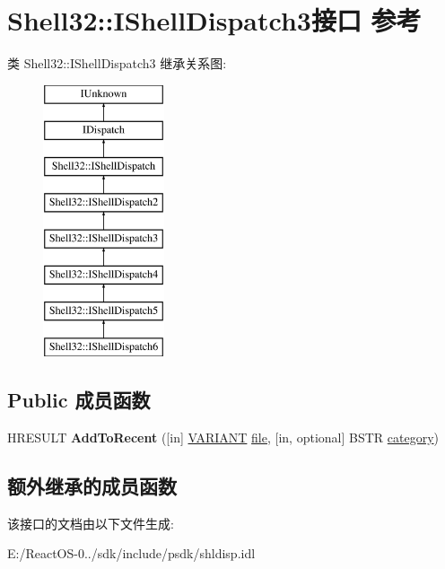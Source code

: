 \hypertarget{interface_shell32_1_1_i_shell_dispatch3}{}\section{Shell32\+:\+:I\+Shell\+Dispatch3接口 参考}
\label{interface_shell32_1_1_i_shell_dispatch3}
类 Shell32\+:\+:I\+Shell\+Dispatch3 继承关系图\+:\begin{figure}[H]
\begin{center}
\leavevmode
\includegraphics[height=8.000000cm]{interface_shell32_1_1_i_shell_dispatch3}
\end{center}
\end{figure}
\subsection*{Public 成员函数}
\begin{DoxyCompactItemize}
\item 
\mbox{\label{interface_shell32_1_1_i_shell_dispatch3_ae2cf8ee54a1c96485422fb79f6c431b0}} 
H\+R\+E\+S\+U\+LT {\bfseries Add\+To\+Recent} (\mbox{[}in\mbox{]} \hyperlink{structtag_v_a_r_i_a_n_t}{V\+A\+R\+I\+A\+NT} \hyperlink{structfile}{file}, \mbox{[}in, optional\mbox{]} B\+S\+TR \hyperlink{structcategory}{category})
\end{DoxyCompactItemize}
\subsection*{额外继承的成员函数}


该接口的文档由以下文件生成\+:\begin{DoxyCompactItemize}
\item 
E\+:/\+React\+O\+S-\/0../sdk/include/psdk/shldisp.\+idl\end{DoxyCompactItemize}
